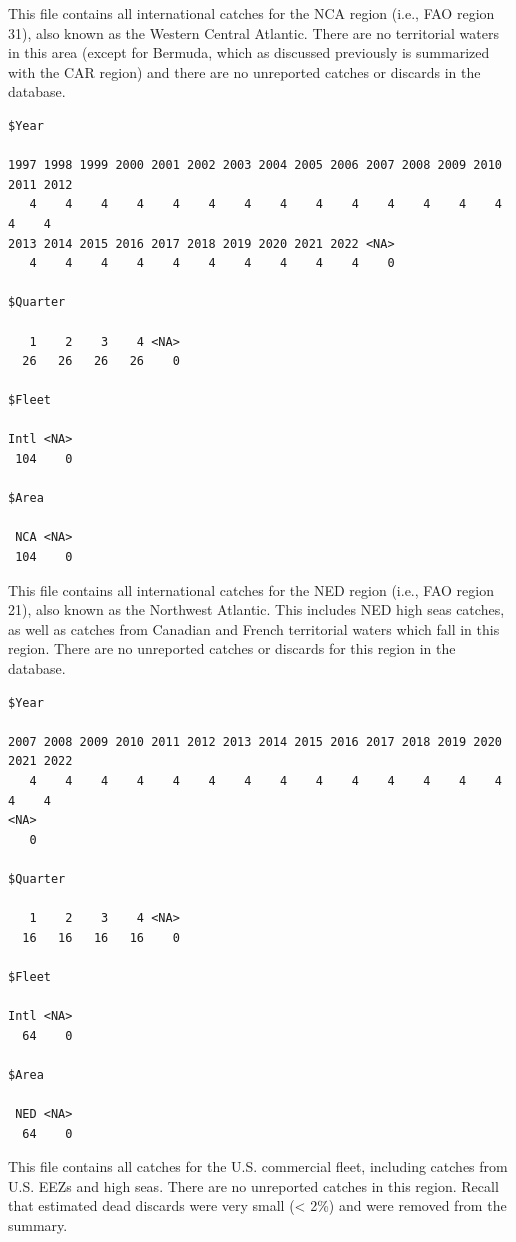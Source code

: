 \documentclass[
  letterpaper,
  oneside,
  open=any]{scrbook}
\begin{document}
This file contains all international catches for the NCA region (i.e.,
FAO region 31), also known as the Western Central Atlantic. There are no
territorial waters in this area (except for Bermuda, which as discussed
previously is summarized with the CAR region) and there are no
unreported catches or discards in the database.

\begin{verbatim}
$Year

1997 1998 1999 2000 2001 2002 2003 2004 2005 2006 2007 2008 2009 2010 2011 2012 
   4    4    4    4    4    4    4    4    4    4    4    4    4    4    4    4 
2013 2014 2015 2016 2017 2018 2019 2020 2021 2022 <NA> 
   4    4    4    4    4    4    4    4    4    4    0 

$Quarter

   1    2    3    4 <NA> 
  26   26   26   26    0 

$Fleet

Intl <NA> 
 104    0 

$Area

 NCA <NA> 
 104    0 
\end{verbatim}

This file contains all international catches for the NED region (i.e.,
FAO region 21), also known as the Northwest Atlantic. This includes NED
high seas catches, as well as catches from Canadian and French
territorial waters which fall in this region. There are no unreported
catches or discards for this region in the database.

\begin{verbatim}
$Year

2007 2008 2009 2010 2011 2012 2013 2014 2015 2016 2017 2018 2019 2020 2021 2022 
   4    4    4    4    4    4    4    4    4    4    4    4    4    4    4    4 
<NA> 
   0 

$Quarter

   1    2    3    4 <NA> 
  16   16   16   16    0 

$Fleet

Intl <NA> 
  64    0 

$Area

 NED <NA> 
  64    0 
\end{verbatim}

This file contains all catches for the U.S. commercial fleet, including
catches from U.S. EEZs and high seas. There are no unreported catches in
this region. Recall that estimated dead discards were very small
(\textless{} 2\%) and were removed from the summary.
\end{document}
